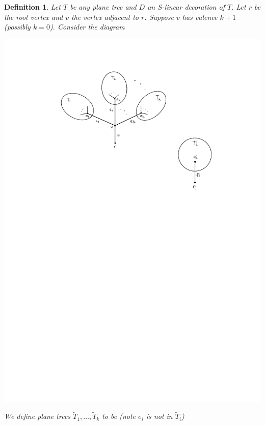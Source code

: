 \documentclass[english,letter paper,12pt,leqno]{article}
\theoremstyle{example}
\newtheorem{definition}[theorem]{Definition}
\numberwithin{equation}{section}
\begin{document}
\begin{definition}\label{defn:branch_decomposition} Let $T$ be any plane tree and $D$ an $S$-linear decoration of $T$. Let $r$ be the root vertex and $v$ the vertex adjacent to $r$. Suppose $v$ has valence $k+1$ (possibly $k = 0$). Consider the diagram
\begin{center}
\includegraphics[scale=0.9]{dia17}
\end{center}
We define plane trees $\widetilde{T}_1,\ldots,\widetilde{T}_k$ to be (note $e_i$ is \emph{not} in $\widetilde{T}_i$)
\begin{center}

\end{center}
\end{definition}
\end{document}
